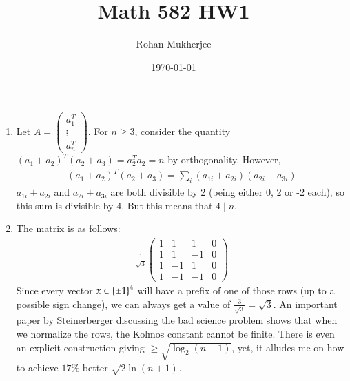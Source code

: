 \documentclass[12pt]{article}
\title{Math 582 HW1}
\date{\today}
\author{Rohan Mukherjee}
\newcommand{\SET}[1]{\Set{\mskip-\medmuskip #1 \mskip-\medmuskip}}
\newcommand{\1}{\mathds 1}
\begin{document}
    \maketitle
    \begin{enumerate}
        \item Let $A = \begin{pmatrix}
            a_1^T \\
            \vdots \\
            a_n^T
        \end{pmatrix}$. For $n \geq 3$, consider the quantity $(a_1 +a_2)^T (a_2+a_3) = a_2^T a_2 = n$ by orthogonality. However, 
        \begin{align*}
            (a_1+a_2)^T(a_2+a_3) = \sum_i (a_{1i}+a_{2i})(a_{2i}+a_{3i})
        \end{align*}
        $a_{1i}+a_{2i}$ and $a_{2i}+a_{3i}$ are both divisible by 2 (being either 0, 2 or -2 each), so this sum is divisible by 4. But this means that $4 \mid n$. 
        \item The matrix is as follows: 
        \begin{align*}
            \frac{1}{\sqrt{3}} \begin{pmatrix}
                1 & 1 & 1 & 0 \\
                1 & 1 & -1 & 0 \\
                1 & -1 & 1 & 0 \\
                1 & -1 & -1 & 0
            \end{pmatrix}
        \end{align*}
        Since every vector $x \in \SET{\pm 1}^4$ will have a prefix of one of those rows (up to a possible sign change), we can always get a value of $\frac{3}{\sqrt{3}} = \sqrt{3}$. An important paper by Steinerberger discussing the bad science problem shows that when we normalize the rows, the Kolmos constant cannot be finite. There is even an explicit construction giving $\geq \sqrt{\log_2(n+1)}$, yet, it alludes me on how to achieve $17\%$ better $\sqrt{2\ln(n+1)}$.


\end{enumerate}
\end{document}
